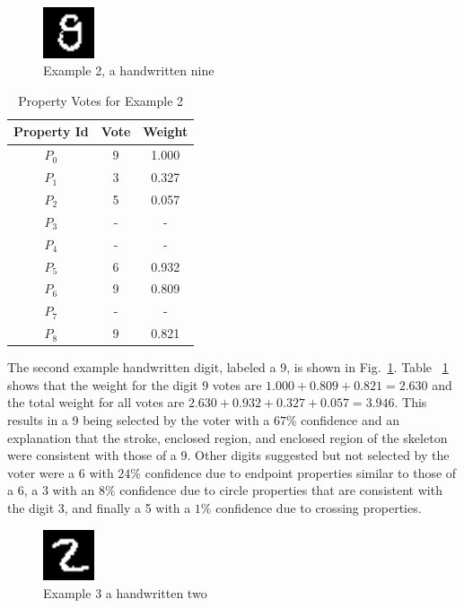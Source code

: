 \documentclass[conference]{IEEEtran}
\begin{document}
 \begin{figure}[htbp]
\centerline{\includegraphics[width=15mm]{./digit-images/9-9.png}}
\caption{Example 2,  a handwritten nine}
\label{example2}
\end{figure}

\begin{table}[htbp]
\caption{Property Votes for Example 2}
\centering
\begin{tabular}{| c | c | c |}
\hline
 Property Id & Vote & Weight \\
\hline\hline
$P_0$ & 9 & 1.000 \\ 
\hline
$P_1$ & 3 & 0.327 \\
\hline
$P_2$ & 5 & 0.057 \\
\hline
$P_3$ & - & - \\
\hline
$P_4$ & - & - \\
\hline
$P_5$ & 6 & 0.932 \\
\hline
$P_6$ & 9 & 0.809 \\
\hline
$P_7$ & - & - \\
\hline
$P_8$ & 9 & 0.821 \\
\hline
\end{tabular}
\label{table:example2}
\end{table}

The second example handwritten digit,  labeled a 9, is shown in Fig.~\ref{example2}.  Table ~\ref{table:example2} shows that the weight for the digit 9 votes are $1.000 + 0.809 + 0.821 = 2.630$ and the total weight for all votes are $2.630 + 0.932 + 0.327 + 0.057 = 3.946$.  This results in a 9 being selected by the voter with a $67\%$ confidence and an explanation that the stroke,  enclosed region, and enclosed region of the skeleton were consistent with those of a 9.  Other digits suggested but not selected by the voter were a 6 with $24\%$ confidence due to endpoint properties similar to those of a 6, a 3 with an $8\%$ confidence due to circle properties that are consistent with the digit 3, and finally a 5 with a $1\%$ confidence due to crossing properties.

 \begin{figure}[htbp]
\centerline{\includegraphics[width=15mm]{./digit-images/2-4.png}}
\caption{Example 3  a handwritten two}
\label{example3}
\end{figure}
\end{document}
